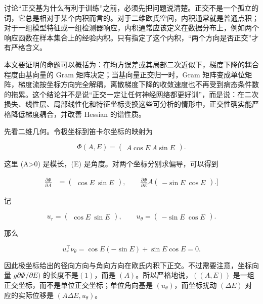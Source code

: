 讨论“正交基为什么有利于训练”之前，必须先把问题说清楚。正交不是一个孤立的词，它总是相对于某个内积而言的。对于二维欧氏空间，内积通常就是普通点积；对于一组模型特征或一组检测器响应，内积通常应该定义在数据分布上，例如两个响应函数在样本集合上的经验内积。只有指定了这个内积，“两个方向是否正交”才有严格含义。

本文要证明的命题可以概括为：在均方误差或其局部二次近似下，梯度下降的耦合程度由基向量的 Gram 矩阵决定；当基向量正交归一时，Gram 矩阵变成单位矩阵，梯度流按坐标方向完全解耦，离散梯度下降的收敛速度也不再受到病态条件数的拖累。这个结论并不是说“正交一定让任何神经网络都更好训”，而是说：在二次损失、线性层、局部线性化和特征坐标变换这些可分析的情形中，正交性确实能严格降低梯度耦合，并改善 Hessian 的谱性质。

先看二维几何。令极坐标到笛卡尔坐标的映射为

\[
\Phi(A,E)=
\begin{pmatrix}
A\cos E\
A\sin E
\end{pmatrix}.
\]

这里 (A>0) 是模长，(E) 是角度。对两个坐标分别求偏导，可以得到

\begin{align}
\frac{\partial \Phi}{\partial A}
&=

\begin{pmatrix}
\cos E\
\sin E
\end{pmatrix},
\qquad
\frac{\partial \Phi}{\partial E} 

A
\begin{pmatrix}
-\sin E\
\cos E
\end{pmatrix}.
]
\end{align}

记

\[
u_r=
\begin{pmatrix}
\cos E\
\sin E
\end{pmatrix},
\qquad
u_\theta=
\begin{pmatrix}
-\sin E\
\cos E
\end{pmatrix}.
\]

那么

\[
u_r^\top \nu_\theta
=\cos E(-\sin E)+\sin E\cos E
=0.
\]

因此极坐标给出的径向方向与角向方向在欧氏内积下正交。不过需要注意，坐标向量 \(g\partial \Phi/\partial E)\) 的长度不是\( (1)\)，而是 \((A)\)。所以严格地说，\(((A,E))\) 是一组正交坐标，而不是单位正交坐标；单位角向基是 \((u_\theta)\)，而坐标扰动 \((\Delta E)\) 对应的实际位移是 \((A\Delta E,u_\theta)\)。

